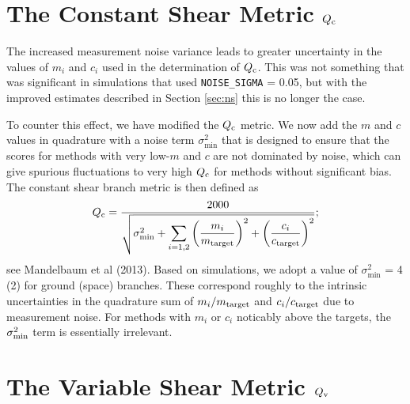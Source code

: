 \documentclass[preprint,11pt]{aastex}
\begin{document}
\section{The Constant Shear Metric $Q_{\rm c}$}\label{sec:qc}
The increased measurement noise variance leads to greater
uncertainty in the values of $m_i$ and $c_i$ used in the determination
of $Q_{\rm c}$.  This was not something that was significant in
simulations that used \texttt{NOISE\_SIGMA} = 0.05, but with the
improved estimates described in Section \ref{sec:ns} this is no longer
the case.

To counter this effect, we have modified the $Q_{\rm c}$ metric. We
now add the $m$ and $c$ values in quadrature with a noise term
$\sigma_\text{min}^2$ that is designed to ensure that the scores for
methods with very low-$m$ and $c$ are not dominated by noise, which
can give spurious fluctuations to very high $Q_{\rm c}$ for methods
without significant bias.  The constant shear branch metric is then
defined as
\begin{equation}\label{eq:q_c}
Q_{\rm c} = \frac{2000}{\sqrt{ \sigma_\text{min}^2 + \displaystyle\sum_{i=1,2} \left(
      \frac{m_i}{m_{\rm target}} \right)^2 + \left( \frac{c_i}{c_{\rm target}} \right)^2 }};
\end{equation}
see Mandelbaum et al (2013).  Based on simulations, we adopt a value of
$\sigma_\text{min}^2$ = 4 (2) for ground (space) branches.  These
correspond roughly to the intrinsic uncertainties in the quadrature
sum of $m_i / m_{\rm target}$ and $c_i / c_{\rm target}$ due to
measurement noise. For methods with $m_i$ or $c_i$ noticably above the
targets, the $\sigma^2_{\rm min}$ term is essentially irrelevant.

\section{The Variable Shear Metric $Q_{\rm v}$}\label{sec:qv}
\end{document}
